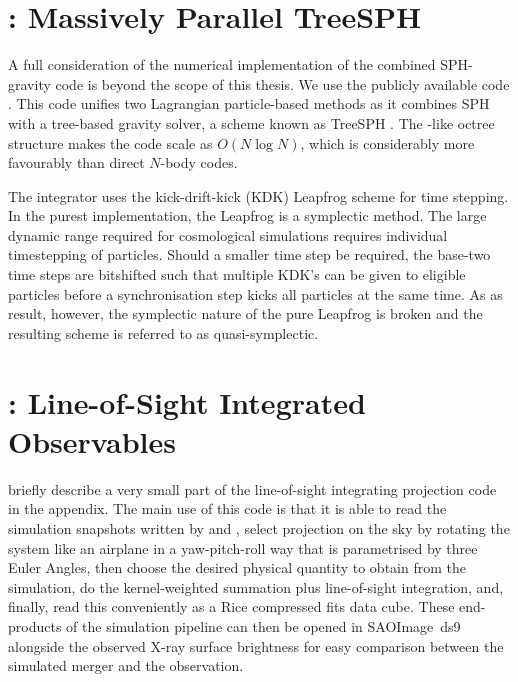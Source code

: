 \documentclass[MScProj_TLRH_ClusterEnergy.tex]{subfiles}
\begin{document}
\section{: Massively Parallel TreeSPH}
\label{sec:methods-gadget}

A full consideration of the numerical implementation of the combined SPH-gravity
code is beyond the scope of this thesis. We use the publicly available code 
 \citep{2001NewA....6...79S, 2005MNRAS.364.1105S}. This code unifies
two Lagrangian particle-based methods as it combines SPH with a tree-based gravity
solver, a scheme known as TreeSPH \citep{1989ApJS...70..419H}. The  
\citet{1986Natur.324..446B}-like octree structure makes the code scale as $O(N \log N)$,
which is considerably more favourably than direct $N$-body codes.

The integrator uses the kick-drift-kick (KDK) Leapfrog scheme for time stepping.
In the purest implementation, the Leapfrog is a symplectic method. The large dynamic
range required for cosmological simulations requires individual timestepping of
particles. Should a smaller time step be required, the base-two time steps are
bitshifted such that multiple KDK's can be given to eligible particles before
a synchronisation step kicks all particles at the same time. As as result, however,
the symplectic nature of the pure Leapfrog is broken and the resulting scheme
is referred to as quasi-symplectic.




\section{: Line-of-Sight Integrated Observables}
\label{sec:methods-psmac}
\citet{2014MNRAS.443.3564D} briefly describe a very small part of the line-of-sight 
integrating projection code  in the appendix. The main use of this
code is that it is able to read the simulation snapshots written by 
and , select projection on the sky by rotating the system like
an airplane in a yaw-pitch-roll way that is parametrised by three Euler Angles,
then choose the desired physical quantity to obtain from the simulation, do the
kernel-weighted summation plus line-of-sight integration, and, finally, read
this conveniently as a Rice compressed fits data cube. These end-products of the
simulation pipeline can then be opened in SAOImage~ds9 \citep{2003ASPC..295..489J}
alongside the observed X-ray surface brightness for easy comparison between the
simulated merger and the observation.
\end{document}
